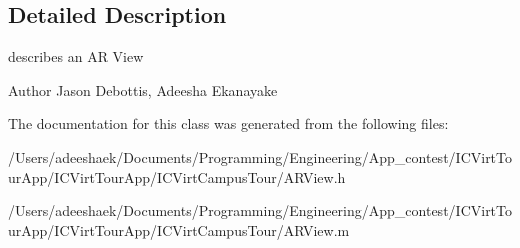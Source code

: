 \subsection{Detailed Description}
describes an A\-R View 

\begin{DoxyAuthor}{Author}
Jason Debottis, Adeesha Ekanayake 
\end{DoxyAuthor}


The documentation for this class was generated from the following files\-:\begin{DoxyCompactItemize}
\item 
/\-Users/adeeshaek/\-Documents/\-Programming/\-Engineering/\-App\-\_\-contest/\-I\-C\-Virt\-Tour\-App/\-I\-C\-Virt\-Tour\-App/\-I\-C\-Virt\-Campus\-Tour/A\-R\-View.\-h\item 
/\-Users/adeeshaek/\-Documents/\-Programming/\-Engineering/\-App\-\_\-contest/\-I\-C\-Virt\-Tour\-App/\-I\-C\-Virt\-Tour\-App/\-I\-C\-Virt\-Campus\-Tour/A\-R\-View.\-m\end{DoxyCompactItemize}
